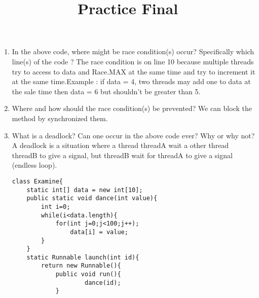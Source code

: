 \documentclass{article}
\author{}
\date{}
\title{Practice Final}
\begin{document}
\maketitle
\begin{enumerate}
\begin{lstlisting}
class Race{
	public static final int MAX = 5;
 	public static final int MIN = 1;

 	private static int data=Race.MIN;
	public static int getData(){
		return data;
	}
	public static void incData() {
		if (data < Race.MAX)
			data++;
	}
	public static void foo() throws Exception{
		while (data < Race.MAX)
			incData();
	}
}

public class Car implements Runnable { 
	public void run(){
		Race.foo();
	}
	public static void main(String[] args) throws Exception{
  		Thread t1 = new Thread(new Car());
  		Thread t2 = new Thread(new Car());
  		t1.start();
  		t2.start();
  		t1.join();
  		t2.join();
  		System.out.println(Race.getData());
 	}
}
\end{lstlisting}
	\item In the above code, where might be race condition(s) occur? Specifically which line(s) of the code ?\newline
	The race condition is on line 10 because multiple threads try to access to data and Race.MAX at the same time and try to increment it at the same time.\newline Example : if data = 4, two threads may add one to data at the sale time then data = 6 but shouldn't be greater than 5.
	\item Where and how should the race condition(s) be prevented?\newline
	We can block the method by synchronized them.
	\item What is a deadlock? Can one occur in the above code ever? Why or why not?\newline
	A deadlock is a situation where a thread threadA wait a other thread threadB to give a signal, but threadB wait for threadA to give a signal (endless loop).
\newpage
\begin{lstlisting}
class Examine{
 	static int[] data = new int[10];
 	public static void dance(int value){
  		int i=0;
  		while(i<data.length){
   			for(int j=0;j<100;j++);
   				data[i] = value;
  		}
 	}
 	static Runnable launch(int id){
  		return new Runnable(){
   			public void run(){
    				dance(id);
   			}

\end{lstlisting}
\end{enumerate}
\end{document}

